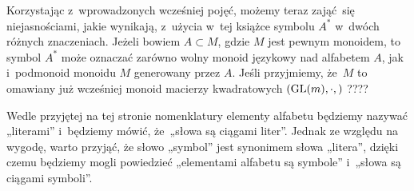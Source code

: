 \documentclass[a4paper,11pt]{article}
\begin{document}
\vspace{\spaceFour}



\start {} Korzystając z~wprowadzonych wcześniej pojęć, możemy teraz
zająć~się niejasnościami, jakie wynikają, z~użycia w~tej książce symbolu
$A^{ * }$ w~dwóch różnych znaczeniach. Jeżeli bowiem $A \subset M$, gdzie $M$ jest
pewnym monoidem, to symbol $A^{ * }$ może oznaczać zarówno wolny monoid
językowy nad alfabetem $A$, jak i~podmonoid monoidu $M$ generowany przez
$A$. Jeśli przyjmiemy, że~$M$ to omawiany już wcześniej monoid macierzy
kwadratowych $( \mathrm{GL}( m ), \cdot, )$ ????

\vspace{\spaceFour}



\start {} Wedle przyjętej na tej stronie nomenklatury elementy
alfabetu będziemy nazywać „literami” i~będziemy mówić, że~„słowa są
ciągami liter”. Jednak ze względu na wygodę, warto przyjąć, że słowo
„symbol” jest synonimem słowa „litera”, dzięki czemu będziemy mogli
powiedzieć „elementami alfabetu są symbole” i~„słowa są ciągami
symboli”.

\vspace{\spaceFour}









\end{document}
